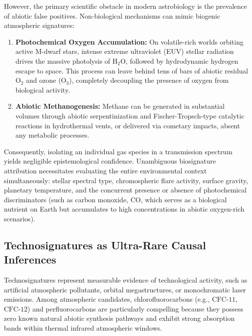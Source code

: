 However, the primary scientific obstacle in modern astrobiology is the prevalence of abiotic false positives. Non-biological mechanisms can mimic biogenic atmospheric signatures:
\begin{enumerate}
    \item \textbf{Photochemical Oxygen Accumulation:} On volatile-rich worlds orbiting active M-dwarf stars, intense extreme ultraviolet (EUV) stellar radiation drives the massive photolysis of $\mathrm{H}_2\mathrm{O}$, followed by hydrodynamic hydrogen escape to space. This process can leave behind tens of bars of abiotic residual $\mathrm{O}_2$ and ozone ($\mathrm{O}_3$), completely decoupling the presence of oxygen from biological activity.
    \item \textbf{Abiotic Methanogenesis:} Methane can be generated in substantial volumes through abiotic serpentinization and Fischer-Tropsch-type catalytic reactions in hydrothermal vents, or delivered via cometary impacts, absent any metabolic processes.
\end{enumerate}

Consequently, isolating an individual gas species in a transmission spectrum yields negligible epistemological confidence. Unambiguous biosignature attribution necessitates evaluating the entire environmental context simultaneously: stellar spectral type, chromospheric flare activity, surface gravity, planetary temperature, and the concurrent presence or absence of photochemical discriminators (such as carbon monoxide, $\mathrm{CO}$, which serves as a biological nutrient on Earth but accumulates to high concentrations in abiotic oxygen-rich scenarios).

\subsection{Technosignatures as Ultra-Rare Causal Inferences}
Technosignatures represent measurable evidence of technological activity, such as artificial atmospheric pollutants, orbital megastructures, or monochromatic laser emissions. Among atmospheric candidates, chlorofluorocarbons (e.g., $\text{CFC-11}$, $\text{CFC-12}$) and perfluorocarbons are particularly compelling because they possess zero known natural abiotic synthesis pathways and exhibit strong absorption bands within thermal infrared atmospheric windows. 

